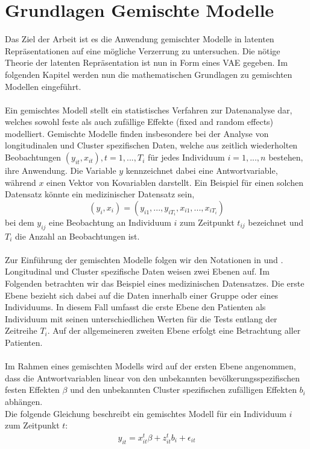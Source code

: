 \documentclass[%
thesis=student,%
coverpage=false,%
titlepage=false,%
headmarks=true, %
german,%
font=libertine, %
math=newpxtx, %
BCOR=5mm,%
coverBCOR=11mm%
]{tumbook}
\theoremstyle{break}
\begin{document}
\section{Grundlagen Gemischte Modelle}
Das Ziel der Arbeit ist es die Anwendung gemischter Modelle in latenten Repräsentationen auf eine mögliche Verzerrung zu untersuchen. Die nötige Theorie der latenten Repräsentation ist nun in Form eines VAE gegeben. Im folgenden Kapitel werden nun die mathematischen Grundlagen zu gemischten Modellen eingeführt.\\
\\
Ein gemischtes Modell stellt ein statistisches Verfahren zur Datenanalyse dar, welches sowohl feste als auch zufällige Effekte (fixed and random effects) modelliert. Gemischte Modelle finden insbesondere bei der Analyse von longitudinalen und Cluster spezifischen Daten, welche aus zeitlich wiederholten Beobachtungen $(y_{it}, x_{it}), t = 1,..., T_i$ für jedes Individuum $ i = 1,...,n$ bestehen, ihre Anwendung. Die Variable $y$ kennzeichnet dabei eine Antwortvariable, während $x$ einen Vektor von Kovariablen darstellt. Ein Beispiel für einen solchen Datensatz könnte ein medizinischer Datensatz sein,\\
$$(y_i,x_i)= (y_{i1},...,y_{iT_i},x_{i1},...,x_{iT_i})$$
bei dem $y_{ij}$ eine Beobachtung an Individuum $i$ zum Zeitpunkt $t_{ij}$ bezeichnet und $T_i$ die Anzahl an Beobachtungen ist.\\
\\
Zur Einführung der gemischten Modelle folgen wir den Notationen in \cite{fahrmeir-2001-multivariate} und \cite{fahrmeir-2011-regression}.
Longitudinal und Cluster spezifische Daten weisen zwei Ebenen auf. Im Folgenden betrachten wir das Beispiel eines medizinischen Datensatzes. Die erste Ebene bezieht sich dabei auf die Daten innerhalb einer Gruppe oder eines Individuums. In diesem Fall umfasst die erste Ebene den Patienten als Individuum mit seinen unterschiedlichen Werten für die Tests entlang der Zeitreihe $T_i$. Auf der allgemeineren zweiten Ebene erfolgt eine Betrachtung aller Patienten. \\
\\
Im Rahmen eines gemischten Modells wird auf der ersten Ebene angenommen, dass die Antwortvariablen linear von den unbekannten bevölkerungsspezifischen festen Effekten $\beta$ und den unbekannten Cluster spezifischen zufälligen Effekten $b_i$ abhängen.\\
Die folgende Gleichung beschreibt ein gemischtes Modell für ein Individuum $i$ zum Zeitpunkt $t$:
\begin{align} 
	y_{it} = x^t_{it}\beta + z^t_{it}b_i + \epsilon_{it} \label{ClusterMM}
\end{align} \noindent
\end{document}
